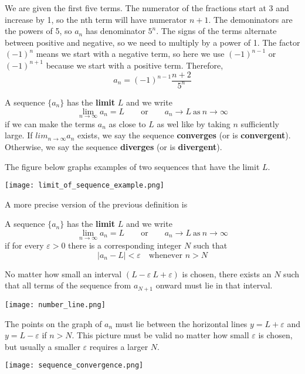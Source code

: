   \begin{solution}
    We are given the first five terms. The numerator of the fractions start at 3 and increase by 1, so the nth term will have numerator $n+1$. The demoninators are the powers of 5, so $a_n$ has denominator $5^n$. The signs of the terms alternate between positive and negative, so we need to multiply by a power of 1. The factor $(-1)^n$ means we start with a negative term, so here we use $(-1)^{n-1}$ or $(-1)^{n+1}$ because we start with a positive term. Therefore,
    $$a_n=(-1)^{n-1}\frac{n+2}{5^n}$$
  \end{solution}
  \begin{definition}
    A sequence $\{a_n\}$ has the \textbf{limit} $L$ and we write
    $$\lim_{n\to\infty} a_n = L \qquad \text{or} \qquad a_n \to L\ \text{as}\ n \to \infty$$
    if we can make the terms $a_n$ as close to $L$ as wel like by taking $n$ sufficiently large. If $lim_{n \to \infty} a_n$ exists, we say the sequence \textbf{converges} (or is \textbf{convergent}). Otherwise, we say the sequence \textbf{diverges} (or is \textbf{divergent}).
  \end{definition}
  The figure below graphs examples of two sequences that have the limit $L$.
  \begin{center}
    \texttt{[image: limit\_of\_sequence\_example.png]}
  \end{center}
  A more precise version of the previous definition is
  \begin{definition}
    A sequence $\{a_n\}$ has the \textbf{limit} $L$ and we write
    $$\lim_{n\to\infty} a_n = L \qquad \text{or} \qquad a_n \to L\ \text{as}\ n \to \infty$$
    if for every $\varepsilon > 0$ there is a corresponding integer $N$ such that
    $$|a_n - L| < \varepsilon \quad \text{whenever } n > N$$
  \end{definition}
  No matter how small an interval $(L-\varepsilon\ L+\varepsilon)$ is chosen, there exists an $N$ such that all terms of the sequence from $a_{N+1}$ onward must lie in that interval.
  \begin{center}
    \texttt{[image: number\_line.png]}
  \end{center}
  The points on the graph of $a_n$ must lie between the horizontal lines $y=L+\varepsilon$ and $y=L-\varepsilon$ if $n > N$. This picture must be valid no matter how small $\varepsilon$ is chosen, but usually a smaller $\varepsilon$ requires a larger $N$.
  \begin{center}
    \texttt{[image: sequence\_convergence.png]}
  \end{center}
